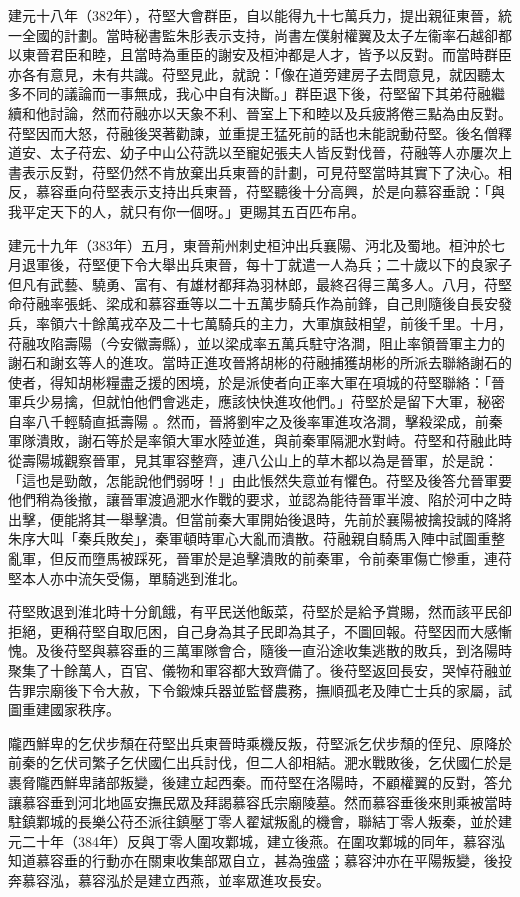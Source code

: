 建元十八年（382年），苻堅大會群臣，自以能得九十七萬兵力，提出親征東晉，統一全國的計劃。當時秘書監朱肜表示支持，尚書左僕射權翼及太子左衞率石越卻都以東晉君臣和睦，且當時為重臣的謝安及桓沖都是人才，皆予以反對。而當時群臣亦各有意見，未有共識。苻堅見此，就說：「像在道旁建房子去問意見，就因聽太多不同的議論而一事無成，我心中自有決斷。」群臣退下後，苻堅留下其弟苻融繼續和他討論，然而苻融亦以天象不利、晉室上下和睦以及兵疲將倦三點為由反對。苻堅因而大怒，苻融後哭著勸諫，並重提王猛死前的話也未能說動苻堅。後名僧釋道安、太子苻宏、幼子中山公苻詵以至寵妃張夫人皆反對伐晉，苻融等人亦屢次上書表示反對，苻堅仍然不肯放棄出兵東晉的計劃，可見苻堅當時其實下了決心。相反，慕容垂向苻堅表示支持出兵東晉，苻堅聽後十分高興，於是向慕容垂說：「與我平定天下的人，就只有你一個呀。」更賜其五百匹布帛。

建元十九年（383年）五月，東晉荊州刺史桓沖出兵襄陽、沔北及蜀地。桓沖於七月退軍後，苻堅便下令大舉出兵東晉，每十丁就遣一人為兵；二十歲以下的良家子但凡有武藝、驍勇、富有、有雄材都拜為羽林郎，最終召得三萬多人。八月，苻堅命苻融率張蚝、梁成和慕容垂等以二十五萬步騎兵作為前鋒，自己則隨後自長安發兵，率領六十餘萬戎卒及二十七萬騎兵的主力，大軍旗鼓相望，前後千里。十月，苻融攻陷壽陽（今安徽壽縣），並以梁成率五萬兵駐守洛澗，阻止率領晉軍主力的謝石和謝玄等人的進攻。當時正進攻晉將胡彬的苻融捕獲胡彬的所派去聯絡謝石的使者，得知胡彬糧盡乏援的困境，於是派使者向正率大軍在項城的苻堅聯絡：「晉軍兵少易擒，但就怕他們會逃走，應該快快進攻他們。」苻堅於是留下大軍，秘密自率八千輕騎直抵壽陽 。然而，晉將劉牢之及後率軍進攻洛澗，擊殺梁成，前秦軍隊潰敗，謝石等於是率領大軍水陸並進，與前秦軍隔淝水對峙。苻堅和苻融此時從壽陽城觀察晉軍，見其軍容整齊，連八公山上的草木都以為是晉軍，於是說：「這也是勁敵，怎能說他們弱呀！」由此悵然失意並有懼色。苻堅及後答允晉軍要他們稍為後撤，讓晉軍渡過淝水作戰的要求，並認為能待晉軍半渡、陷於河中之時出擊，便能將其一舉擊潰。但當前秦大軍開始後退時，先前於襄陽被擒投誠的降將朱序大叫「秦兵敗矣」，秦軍頓時軍心大亂而潰散。苻融親自騎馬入陣中試圖重整亂軍，但反而墮馬被踩死，晉軍於是追擊潰敗的前秦軍，令前秦軍傷亡慘重，連苻堅本人亦中流矢受傷，單騎逃到淮北。

苻堅敗退到淮北時十分飢餓，有平民送他飯菜，苻堅於是給予賞賜，然而該平民卻拒絕，更稱苻堅自取厄困，自己身為其子民即為其子，不圖回報。苻堅因而大感慚愧。及後苻堅與慕容垂的三萬軍隊會合，隨後一直沿途收集逃散的敗兵，到洛陽時聚集了十餘萬人，百官、儀物和軍容都大致齊備了。後苻堅返回長安，哭悼苻融並告罪宗廟後下令大赦，下令鍛煉兵器並監督農務，撫順孤老及陣亡士兵的家屬，試圖重建國家秩序。

隴西鮮卑的乞伏步頹在苻堅出兵東晉時乘機反叛，苻堅派乞伏步頹的侄兒、原降於前秦的乞伏司繁子乞伏國仁出兵討伐，但二人卻相結。淝水戰敗後，乞伏國仁於是裹脅隴西鮮卑諸部叛變，後建立起西秦。而苻堅在洛陽時，不顧權翼的反對，答允讓慕容垂到河北地區安撫民眾及拜謁慕容氏宗廟陵墓。然而慕容垂後來則乘被當時駐鎮鄴城的長樂公苻丕派往鎮壓丁零人翟斌叛亂的機會，聯結丁零人叛秦，並於建元二十年（384年）反與丁零人圍攻鄴城，建立後燕。在圍攻鄴城的同年，慕容泓知道慕容垂的行動亦在關東收集部眾自立，甚為強盛；慕容沖亦在平陽叛變，後投奔慕容泓，慕容泓於是建立西燕，並率眾進攻長安。

